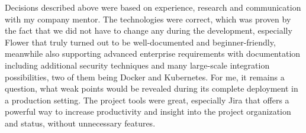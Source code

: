 Decisions described above were based on experience, research and communication with my company mentor. The technologies were correct, which was proven by the fact that we did not have to change any during the development, especially Flower that truly turned out to be well-documented and beginner-friendly, meanwhile also supporting advanced enterprise requirements with documentation including additional security techniques and many large-scale integration possibilities, two of them being Docker and Kubernetes. For me, it remains a question, what weak points would be revealed during its complete deployment in a production setting. The project tools were great, especially Jira that offers a powerful way to increase productivity and insight into the project organization and status, without unnecessary features.
